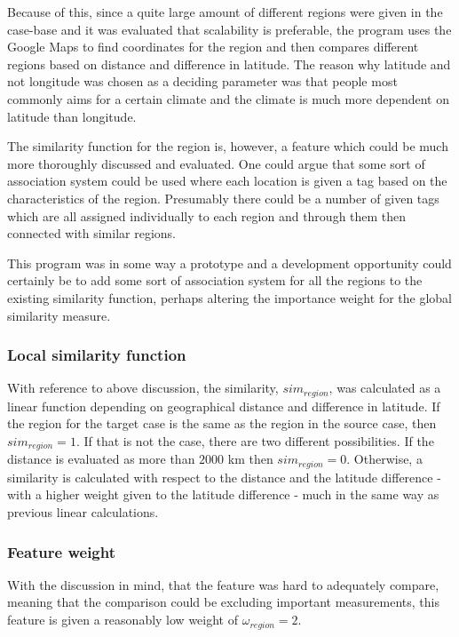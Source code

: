\documentclass[12pt]{article}
\begin{document}
Because of this, since a quite large amount of different regions were given in the case-base and it was evaluated that scalability is preferable, the program uses the Google Maps to find coordinates for the region and then compares different regions based on distance and difference in latitude. The reason why latitude and not longitude was chosen as a deciding parameter was that people most commonly aims for a certain climate and the climate is much more dependent on latitude than longitude. 

The similarity function for the region is, however, a feature which could be much more thoroughly discussed and evaluated. One could argue that some sort of association system could be used where each location is given a tag based on the characteristics of the region. Presumably there could be a number of given tags which are all assigned individually to each region and through them then connected with similar regions. 

This program was in some way a prototype and a development opportunity could certainly be to add some sort of association system for all the regions to the existing similarity function, perhaps altering the importance weight for the global similarity measure. 

\subsubsection{Local similarity function}
\label{sec:region-sim}

With reference to above discussion, the similarity, $sim_{region}$, was calculated as a linear function depending on geographical distance and difference in latitude. If the region for the target case is the same as the region in the source case, then $sim_{region}=1$. If that is not the case, there are two different possibilities. If the distance is evaluated as more than $2000$ km then $sim_{region}=0$. Otherwise, a similarity is calculated with respect to the distance and the latitude difference - with a higher weight given to the latitude difference - much in the same way as previous linear calculations. 

\subsubsection{Feature weight}
\label{sec:region-weight}

With the discussion in mind, that the feature was hard to adequately compare, meaning that the comparison could be excluding important measurements, this feature is given a reasonably low weight of $\omega_{region}=2$. 
\end{document}
